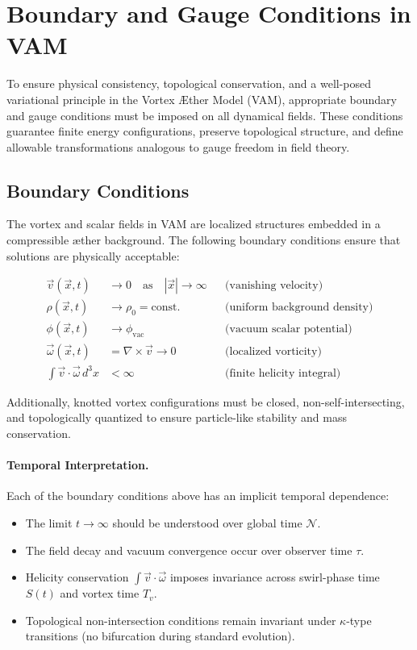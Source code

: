 \documentclass[12pt]{article}
\begin{document}
\section{Boundary and Gauge Conditions in VAM}

To ensure physical consistency, topological conservation, and a well-posed variational principle in the Vortex \AE{}ther Model (VAM), appropriate boundary and gauge conditions must be imposed on all dynamical fields. These conditions guarantee finite energy configurations, preserve topological structure, and define allowable transformations analogous to gauge freedom in field theory.

\subsection{Boundary Conditions}

The vortex and scalar fields in VAM are localized structures embedded in a compressible \ae{}ther background. The following boundary conditions ensure that solutions are physically acceptable:

\begin{align*}
    \vec{v}(\vec{x}, t) &\rightarrow 0 \quad \text{as} \quad |\vec{x}| \rightarrow \infty && \text{(vanishing velocity)} \\
    \rho(\vec{x}, t) &\rightarrow \rho_0 = \text{const.} && \text{(uniform background density)} \\
    \phi(\vec{x}, t) &\rightarrow \phi_{\text{vac}} && \text{(vacuum scalar potential)} \\
    \vec{\omega}(\vec{x}, t) &= \nabla \times \vec{v} \rightarrow 0 && \text{(localized vorticity)} \\
    \int \vec{v} \cdot \vec{\omega} \, d^3x &< \infty && \text{(finite helicity integral)}
\end{align*}

Additionally, knotted vortex configurations must be closed, non-self-intersecting, and topologically quantized to ensure particle-like stability and mass conservation.

\paragraph{Temporal Interpretation.}
Each of the boundary conditions above has an implicit temporal dependence:
\begin{itemize}
    \item The limit $t \to \infty$ should be understood over global time $\mathcal{N}$.
    \item The field decay and vacuum convergence occur over observer time $\tau$.
    \item Helicity conservation $\int \vec{v} \cdot \vec{\omega}$ imposes invariance across swirl-phase time $S(t)$ and vortex time $T_v$.
    \item Topological non-intersection conditions remain invariant under $\kappa$-type transitions (no bifurcation during standard evolution).
\end{itemize}
\end{document}
